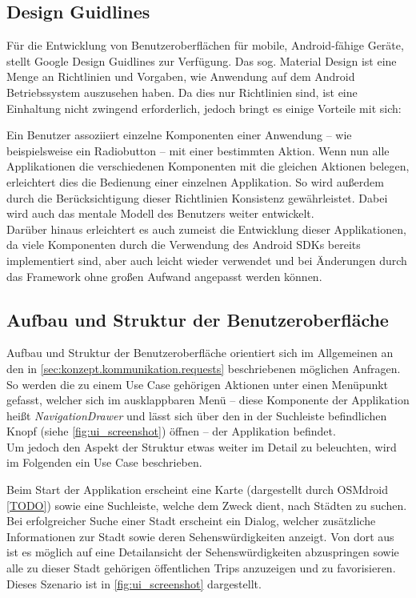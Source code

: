 		\subsection{Design Guidlines} %
		
			Für die Entwicklung von Benutzeroberflächen für mobile, Android-fähige Geräte, stellt Google Design Guidlines zur Verfügung. Das sog. Material Design \cite{Google.3182020} ist eine Menge an Richtlinien und Vorgaben, wie Anwendung auf dem Android Betriebssystem auszusehen haben. Da dies nur Richtlinien sind, ist eine Einhaltung nicht zwingend erforderlich, jedoch bringt es einige Vorteile mit sich:
			
			Ein Benutzer assoziiert einzelne Komponenten einer Anwendung -- wie beispielsweise ein Radiobutton -- mit einer bestimmten Aktion. Wenn nun alle Applikationen die verschiedenen Komponenten mit die gleichen Aktionen belegen, erleichtert dies die Bedienung einer einzelnen Applikation. So wird außerdem durch die Berücksichtigung dieser Richtlinien Konsistenz gewährleistet. Dabei wird auch das mentale Modell des Benutzers weiter entwickelt. \\
			Darüber hinaus erleichtert es auch zumeist die Entwicklung dieser Applikationen, da viele Komponenten durch die Verwendung des Android \acs{SDK}s bereits implementiert sind, aber auch leicht wieder verwendet und bei Änderungen durch das Framework ohne großen Aufwand angepasst werden können. \cite{SaadiaMinhas.3232020}
		
		\subsection{Aufbau und Struktur der Benutzeroberfläche} %
		
			Aufbau und Struktur der Benutzeroberfläche orientiert sich im Allgemeinen an den in \autoref{sec:konzept.kommunikation.requests} beschriebenen möglichen Anfragen. So werden die zu einem Use Case gehörigen Aktionen unter einen Menüpunkt gefasst, welcher sich im ausklappbaren Menü -- diese Komponente der Applikation heißt \textit{NavigationDrawer} und lässt sich über den in der Suchleiste befindlichen Knopf (siehe \autoref{fig:ui_screenshot}) öffnen -- der Applikation befindet. \\
			Um jedoch den Aspekt der Struktur etwas weiter im Detail zu beleuchten, wird im Folgenden ein Use Case beschrieben. 
		
			Beim Start der Applikation erscheint eine Karte (dargestellt durch OSMdroid \autoref{TODO}) sowie eine Suchleiste, welche dem Zweck dient, nach Städten zu suchen. Bei erfolgreicher Suche einer Stadt erscheint ein Dialog, welcher zusätzliche Informationen zur Stadt sowie deren Sehenswürdigkeiten anzeigt. Von dort aus ist es möglich auf eine Detailansicht der Sehenswürdigkeiten abzuspringen sowie alle zu dieser Stadt gehörigen öffentlichen Trips anzuzeigen und zu favorisieren. Dieses Szenario ist in \autoref{fig:ui_screenshot} dargestellt.  
			
